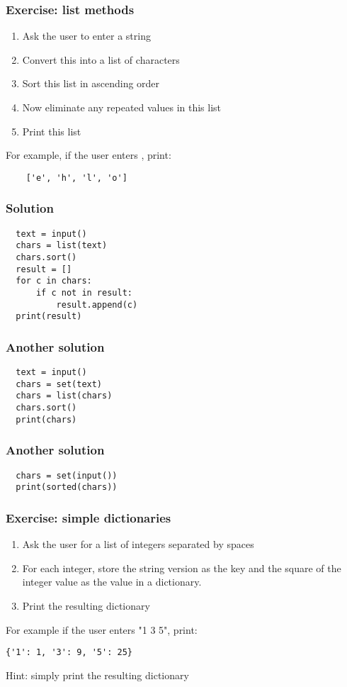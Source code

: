 \documentclass[14pt,compress]{beamer}
\begin{document}
\begin{frame}
  \frametitle{Exercise: list methods}
  \begin{enumerate}
  \item Ask the user to enter a string
  \item Convert this into a list of characters
  \item Sort this list in ascending order
  \item Now eliminate any repeated values in this list
  \item Print this list
  \end{enumerate}
  For example, if the user enters , print:
  \begin{lstlisting}
    ['e', 'h', 'l', 'o']
  \end{lstlisting}
\end{frame}

\begin{frame}
\frametitle{Solution}
\begin{lstlisting}
  text = input()
  chars = list(text)
  chars.sort()
  result = []
  for c in chars:
      if c not in result:
          result.append(c)
  print(result)
\end{lstlisting}
\end{frame}

\begin{frame}
\frametitle{Another solution}
\begin{lstlisting}
  text = input()
  chars = set(text)
  chars = list(chars)
  chars.sort()
  print(chars)
\end{lstlisting}
\end{frame}

\begin{frame}
\frametitle{Another solution}
\begin{lstlisting}
  chars = set(input())
  print(sorted(chars))
\end{lstlisting}
\end{frame}

\begin{frame}
  \frametitle{Exercise: simple dictionaries}
  \begin{enumerate}
  \item Ask the user for a list of integers separated by spaces
  \item For each integer, store the string version as the key and the square of
    the integer value as the value in a dictionary.
  \item Print the resulting dictionary
  \end{enumerate}
For example if the user enters "1 3 5", print:
\begin{lstlisting}
{'1': 1, '3': 9, '5': 25}
\end{lstlisting}
Hint: simply print the resulting dictionary
\end{frame}
\end{document}
